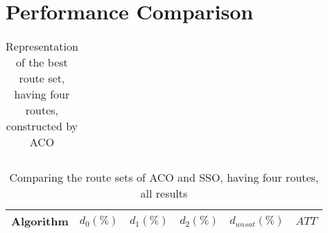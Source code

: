 \section{Performance Comparison}

\begin{table}[H]
    \centering
    \begin{tabular}{|l|llllllll|}
    \hline
    \hline
    \end{tabular}
    \caption {Representation of the best route set, having four routes, constructed by ACO}
    \label{table:performanceComparison_bestRouteSet4_ACO}
\end{table}

    \begin{table}[H]
    \centering
    \begin{tabular}{|l||l|l|l|l|l|}
    \hline
    Algorithm & $d_0(\%)$ & $d_1(\%)$ & $d_2(\%)$ & $d_{unsat}(\%)$ & $ATT$ \\
    \hline
    \hline
    \hline
    \hline
    \end{tabular}
    \caption {Comparing the route sets of ACO and SSO, having four routes, all results}
    \label{table:performanceComparison_ACOFull}
    \end{table}


